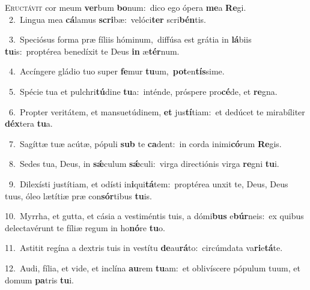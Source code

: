 \lettrine{\initial\textcolor{\initialcolor}{E}}{ructávit} cor meum \textbf{ver}\-bum \textbf{bo}\-num:~\star dico ego ópera \textbf{me}\-a \textbf{Re}\-gi.\\
{\numbfont\textcolor{\numbcolor}{~2.}}~Lingua mea \textbf{cá}\-lamus \textbf{scri}\-bæ:~\star velóci\textbf{ter} scri\-\textbf{bén}\-tis.\par
{\numbfont\textcolor{\numbcolor}{~3.}}~Speciósus forma præ fíliis hóminum,~\dagger diffúsa est grátia in \textbf{lá}\-biis \textbf{tu}\-is:~\star proptérea benedíxit te Deus \textbf{in} æ\-\textbf{tér}\-num.\par
{\numbfont\textcolor{\numbcolor}{~4.}}~Accíngere gládio tuo super \textbf{fe}\-mur \textbf{tu}\-um,~\star \textbf{pot}\-en\-\textbf{tís}\-sime.\par
{\numbfont\textcolor{\numbcolor}{~5.}}~Spécie tua et pulchri\-\textbf{tú}\-dine \textbf{tu}\-a:~\star inténde, próspere pro\-\textbf{cé}\-de, et \textbf{re}\-gna.\par
{\numbfont\textcolor{\numbcolor}{~6.}}~Propter veritátem, et mansuetúdinem, \textbf{et} jus\-\textbf{tí}\-tiam:~\star et dedúcet te mirabíliter \textbf{déx}\-tera \textbf{tu}\-a.\par
{\numbfont\textcolor{\numbcolor}{~7.}}~Sagíttæ tuæ acútæ, pópuli \textbf{sub} te \textbf{ca}\-dent:~\star in corda inimi\-\textbf{có}\-rum \textbf{Re}\-gis.\par
{\numbfont\textcolor{\numbcolor}{~8.}}~Sedes tua, Deus, in \textbf{sǽ}\-culum \textbf{sǽ}\-culi:~\star virga directiónis virga \textbf{re}\-gni \textbf{tu}\-i.\par
{\numbfont\textcolor{\numbcolor}{~9.}}~Dilexísti justítiam, et odísti in\-\textbf{i}\-qui\-\textbf{tá}\-tem:~\star proptérea unxit te, Deus, Deus tuus, óleo lætítiæ præ con\-\textbf{sór}\-tibus \textbf{tu}\-is.\par
{\numbfont\textcolor{\numbcolor}{10.}}~Myrrha, et gutta, et cásia a vestiméntis tuis, a dómi\textbf{bus} e\-\textbf{búr}\-neis:~\star ex quibus delectavérunt te fíliæ regum in ho\-\textbf{nó}\-re \textbf{tu}\-o.\par
{\numbfont\textcolor{\numbcolor}{11.}}~Astitit regína a dextris tuis in vestítu \textbf{de}\-au\-\textbf{rá}\-to:~\star circúmdata va\-\textbf{ri}\-e\-\textbf{tá}\-te.\par
{\numbfont\textcolor{\numbcolor}{12.}}~Audi, fília, et vide, et inclína \textbf{au}\-rem \textbf{tu}\-am:~\star et oblivíscere pópulum tuum, et domum \textbf{pa}\-tris \textbf{tu}\-i.\par
